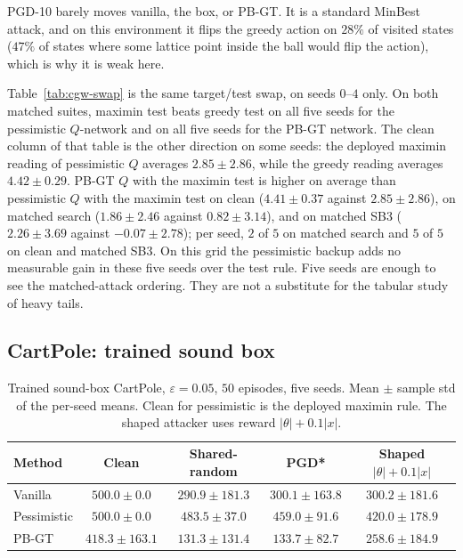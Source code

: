 \documentclass[10pt,twocolumn]{article}
\begin{document}
PGD-10 barely moves vanilla, the box, or PB-GT.
It is a standard MinBest attack, and on this environment it flips the greedy action on $28\%$ of visited states ($47\%$ of states where some lattice point inside the ball would flip the action), which is why it is weak here.

Table~\ref{tab:cgw-swap} is the same target/test swap, on seeds $0$--$4$ only.
On both matched suites, maximin test beats greedy test on all five seeds for the pessimistic $Q$-network and on all five seeds for the PB-GT network.
The clean column of that table is the other direction on some seeds: the deployed maximin reading of pessimistic $Q$ averages $2.85{\pm}2.86$, while the greedy reading averages $4.42{\pm}0.29$.
PB-GT $Q$ with the maximin test is higher on average than pessimistic $Q$ with the maximin test on clean ($4.41{\pm}0.37$ against $2.85{\pm}2.86$), on matched search ($1.86{\pm}2.46$ against $0.82{\pm}3.14$), and on matched SB3 ($2.26{\pm}3.69$ against $-0.07{\pm}2.78$); per seed, $2$ of $5$ on matched search and $5$ of $5$ on clean and matched SB3.
On this grid the pessimistic backup adds no measurable gain in these five seeds over the test rule.
Five seeds are enough to see the matched-attack ordering.
They are not a substitute for the tabular study of heavy tails.

\subsection{CartPole: trained sound box}
\label{sec:cp}

\begin{table}[t]
\centering
\small
\caption{Trained sound-box CartPole, $\varepsilon{=}0.05$, $50$ episodes, five seeds.
Mean $\pm$ sample std of the per-seed means.
Clean for pessimistic is the deployed maximin rule.
The shaped attacker uses reward $|\theta|+0.1|x|$.}
\label{tab:cp}
\setlength{\tabcolsep}{6pt}
\begin{tabular}{@{}lcccc@{}}
\toprule
Method & Clean & Shared-random & PGD* & \shortstack{Shaped\\$|\theta|{+}0.1|x|$} \\
\midrule
Vanilla & $500.0{\pm}0.0$ & $290.9{\pm}181.3$ & $300.1{\pm}163.8$ & $300.2{\pm}181.6$ \\
Pessimistic & $500.0{\pm}0.0$ & $483.5{\pm}37.0$ & $459.0{\pm}91.6$ & $420.0{\pm}178.9$ \\
PB-GT & $418.3{\pm}163.1$ & $131.3{\pm}131.4$ & $133.7{\pm}82.7$ & $258.6{\pm}184.9$ \\
\bottomrule
\end{tabular}
\end{table}
\end{document}
